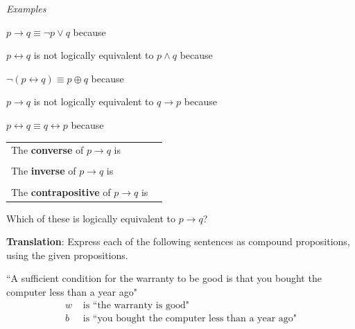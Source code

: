 \documentclass[12pt, oneside]{article}
\begin{document}
{\it Examples} 

$p \to q \equiv \lnot p \lor q$ because \underline{\phantom{\hspace{4in}}} 

\vfill

$p \leftrightarrow q$ is not logically equivalent to $p \land q$ because \underline{\phantom{\hspace{4in}}} 

\vfill

$\lnot( p \leftrightarrow q) \equiv p \oplus q$ because \underline{\phantom{\hspace{4in}}} 

\vfill


$p \to q$ is not logically equivalent to $q \to p$ because \underline{\phantom{\hspace{4in}}} 

\vfill

$p \leftrightarrow q \equiv q \leftrightarrow p$ because \underline{\phantom{\hspace{4in}}} 

\vfill

\begin{tabular}{ll}
The {\bf  converse}  of $p \to q$ is & \underline{\phantom{\hspace{1.6in}}}\\
&  \\
The {\bf  inverse}  of $p \to q$ is  &\underline{\phantom{\hspace{1.6in}}}\\
&  \\
The {\bf  contrapositive}  of $p \to q$ is & \underline{\phantom{\hspace{1.6in}}}
\end{tabular}
Which of these is logically equivalent to $p \to q$?

\vfill
\vfill

\newpage
{\bf Translation}: Express each of the following sentences as compound propositions, using
the given propositions.

\begin{multicols}{2}
``A sufficient condition for the warranty to be good is that you bought the computer less than a year ago"
\columnbreak
\begin{align*}
w &\text{ is  ``the warranty is good"} \\
b &\text{ is  ``you bought the computer less than a year ago"} \\
\end{align*}
\end{multicols}
\vfill
\end{document}
